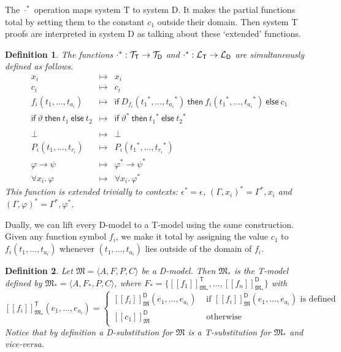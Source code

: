 \documentclass{article}
\newtheorem{definition}{Definition}[section]
\newcommand{\D}{\textsf D}
\newcommand{\T}{\textsf T}
\newcommand{\ifthelse}[3]{\ensuremath{\mathsf{if}\ {#1}\ \mathsf{then}\ {#2}\ \mathsf{else}\ {#3}}}
\newcommand{\starfun}[1]{\ensuremath{{#1}^\ast}}
\newcommand{\starmap}{\starfun\cdot}
\newcommand{\modelfunm}[1]{\ensuremath{\mathfrak{#1}_\ast}}
\newcommand{\modelfun}[1]{\ensuremath{{#1}_\ast}}
\newcommand{\lang}[1]{\ensuremath{{\cal L}_{\mathsf{#1}}}}
\newcommand{\terms}[1]{\ensuremath{{\cal T}_{\mathsf{#1}}}}
\newcommand{\intm}[3]{\ensuremath{[\![{#3}]\!]^{\mathsf{#1}}_{\mathfrak{#2}}}}
\def\sep{.\,}
\begin{document}
The {\starmap} operation maps system {\T} to system {\D}.
It makes the partial functions total by setting them to the constant
$c_1$ outside their domain.
Then system {\T} proofs are interpreted in system {\D} as talking about
these `extended' functions.
\begin{definition}\label{defn:starmap} The functions
$\starmap : \terms{T} \to \terms{D}$ and
$\starmap : \lang{T} \to \lang{D}$ are simultaneously defined as follows.
\begin{eqnarray*}
x_i & \mapsto & x_i \\
c_i & \mapsto & c_i \\
f_i(t_1,\ldots,t_{a_i}) & \mapsto &
 \ifthelse{D_{f_i}(\starfun{t_1},\ldots,\starfun{t_{a_i}})}%
{f_i(\starfun{t_1},\ldots,\starfun{t_{a_i}})}{c_1} \\
\ifthelse\vartheta{t_1}{t_2} & \mapsto &
  \ifthelse{\starfun\vartheta}{\starfun{t_1}}{\starfun{t_2}} \\
\\
\bot & \mapsto & \bot \\
P_i(t_1,\ldots,t_{r_i}) & \mapsto &
 P_i(\starfun{t_1},\ldots,\starfun{t_{r_i}}) \\
\varphi\to\psi & \mapsto & \starfun\varphi\to\starfun\psi \\
\forall x_i\sep\varphi & \mapsto & \forall x_i\sep\starfun\varphi
\end{eqnarray*}
This function is extended trivially to contexts: $\starfun\epsilon=\epsilon$,
$\starfun{(\Gamma,x_i)}=\starfun\Gamma,x_i$ and
$\starfun{(\Gamma,\varphi)}=\starfun\Gamma,\starfun\varphi$.
\end{definition}

Dually, we can lift every {\D}-model to a {\T}-model using the same
construction.  Given any function symbol $f_i$, we make it total by
assigning the value $c_1$ to $f_i(t_1,\ldots,t_{a_i})$ whenever
$(t_1,\ldots,t_{a_i})$ lies outside of the domain of $f_i$.
\begin{definition}\label{defn:modelmap} Let
$\mathfrak M=\langle A,F,P,C\rangle$ be a {\D}-model.  Then $\modelfunm M$
is the {\T}-model defined by $\modelfunm M=\langle A,\modelfun F,P,C\rangle$,
where $\modelfun F=%
\{\intm{T}{\modelfunm M}{f_1},\ldots,\intm{D}{\modelfunm M}{f_n}\}$ with
\[\intm{T}{\modelfunm M}{f_i}(e_1,\ldots,e_{a_i})=%
\left\{\begin{array}{ll} \intm{D}M{f_i}(e_1,\ldots,e_{a_i}) &%
 \mbox{ if $\intm{D}M{f_i}(e_1,\ldots,e_{a_i})$ is defined} \\
\intm{D}M{c_1} & \mbox{ otherwise}\end{array}\right.\]
Notice that by definition a {\D}-substitution for $\mathfrak M$ is a
{\T}-substitution for $\modelfunm M$ and vice-versa.
\end{definition}
\end{document}
